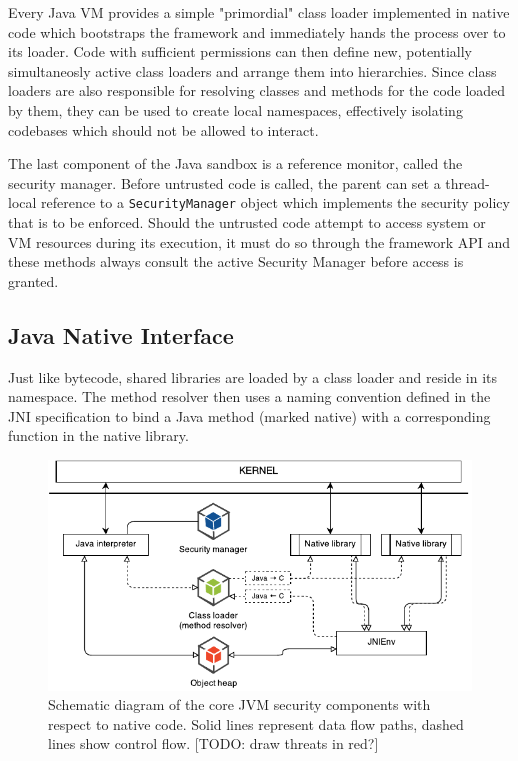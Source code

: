 \documentclass[a4paper,12pt,twoside,openright]{report}
\newcommand{\keyword}[1]{\textsf{#1}}
\newcommand{\class}[1]{\texttt{#1}}
\begin{document}
Every Java VM provides a simple "primordial" class loader implemented in native code which bootstraps the framework and immediately hands the process over to its loader. Code with sufficient permissions can then define new, potentially simultaneosly active class loaders and arrange them into hierarchies. Since class loaders are also responsible for resolving classes and methods for the code loaded by them, they can be used to create local namespaces, effectively isolating codebases which should not be allowed to interact.

The last component of the Java sandbox is a reference monitor, called the security manager. Before untrusted code is called, the parent can set a thread-local reference to a \class{SecurityManager} object which implements the security policy that is to be enforced. Should the untrusted code attempt to access system or VM resources during its execution, it must do so through the framework API and these methods always consult the active Security Manager before access is granted.

\subsection{Java Native Interface}

Just like bytecode, shared libraries are loaded by a class loader and reside in its namespace. The method resolver then uses a naming convention defined in the JNI specification to bind a Java method (marked \keyword{native}) with a corresponding function in the native library.

\begin{figure}
	\includegraphics[width=\textwidth]{dia_jni_orig.pdf}
	\caption{Schematic diagram of the core JVM security components with respect to native code. Solid lines represent data flow paths, dashed lines show control flow. [TODO: draw threats in red?]}
	\label{fig:OverviewJNI}
\end{figure}
\end{document}
